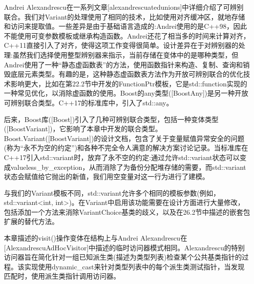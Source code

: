 Andrei Alexandrescu在一系列文章[alexandrescuatedunions]中详细介绍了可辨别联合。我们对Variant的处理使用了相同的技术，比如使用对齐缓冲区，就地存储和访问来提取值。一些差异是由于基础语言造成的:Andrei使用的是C++98，因此不能使用可变参数模板或继承构造函数。Andrei还花了相当多的时间来计算对齐，C++11直接引入了对齐，使得这项工作变得很简单。设计差异在于对辨别器的处理:虽然我们选择使用整型辨别器来指示，当前存储在变体中的是哪种类型，但Andrei使用了一种“静态虚函数表”的方法，使用函数指针来构造、复制、查询和销毁底层元素类型。有趣的是，这种静态虚函数表方法作为开放可辨别联合的优化技术影响更大，比如在第22.2节中开发的FunctionPtr模板，它是std::function实现的一种常见优化，以消除虚函数的使用。Boost的any类型([BoostAny])是另一种开放可辨别联合类型。C++17的标准库中，引入了std::any。

后来，Boost库([Boost])引入了几种可辨别联合类型，包括一种变体类型([BoostVariant])，它影响了本章中开发的联合类型。Boost.Variant([BoostVariant])的设计文档，包含了关于变量赋值异常安全的问题(称为“永不为空的约定”)和各种不完全令人满意的解决方案讨论记录。当标准库在C++17引入std::variant时，放弃了永不空的约定:通过允许std::variant状态可以变成valueless\_by\_exception，从而消除了为备份分配堆存储的需要，而std::variant状态会赋值给它抛出的新值，我们用空变量对这一行为进行了建模。

与我们的Variant模板不同，std::variant允许多个相同的模板参数(例如，std::variant<int, int>)。在Variant中启用该功能需要在设计方面进行大量修改，包括添加一个方法来消除VariantChoice基类的歧义，以及在26.2节中描述的嵌套包扩展的替代方法。

本章描述的visit()操作变体在结构上与Andrei Alexandrescu在[AlexandrescuAdHocVisitor]中描述的临时访问器模式相同。Alexandrescu的特别访问器旨在简化针对一组已知派生类(描述为类型列表)检查某个公共基类指针的过程。该实现使用dynamic\_cast来针对类型列表中的每个派生类测试指针，当发现匹配时，使用派生类指针调用访问器。



